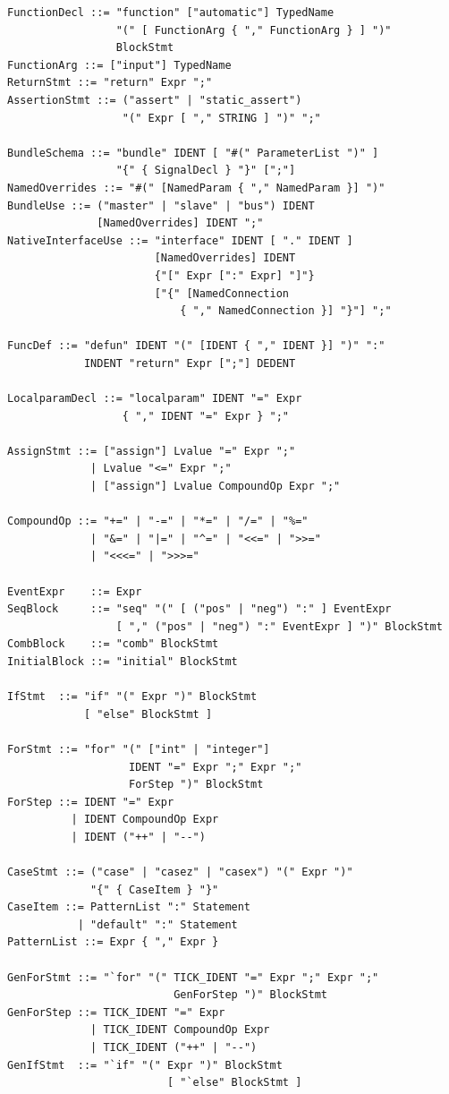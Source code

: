 \documentclass[lang=en,11pt]{elegantbook}
\begin{document}
\begin{lstlisting}[basicstyle=\ttfamily\footnotesize,
  keywordstyle={},
  frame=single,
  backgroundcolor=\color{codebg},
  escapechar=@]
FunctionDecl ::= "function" ["automatic"] TypedName
                 "(" [ FunctionArg { "," FunctionArg } ] ")"
                 BlockStmt
FunctionArg ::= ["input"] TypedName
ReturnStmt ::= "return" Expr ";"
AssertionStmt ::= ("assert" | "static_assert")
                  "(" Expr [ "," STRING ] ")" ";"

BundleSchema ::= "bundle" IDENT [ "#(" ParameterList ")" ]
                 "{" { SignalDecl } "}" [";"]
NamedOverrides ::= "#(" [NamedParam { "," NamedParam }] ")"
BundleUse ::= ("master" | "slave" | "bus") IDENT
              [NamedOverrides] IDENT ";"
NativeInterfaceUse ::= "interface" IDENT [ "." IDENT ]
                       [NamedOverrides] IDENT
                       {"[" Expr [":" Expr] "]"}
                       ["{" [NamedConnection
                           { "," NamedConnection }] "}"] ";"

FuncDef ::= "defun" IDENT "(" [IDENT { "," IDENT }] ")" ":"
            INDENT "return" Expr [";"] DEDENT

LocalparamDecl ::= "localparam" IDENT "=" Expr
                  { "," IDENT "=" Expr } ";"

AssignStmt ::= ["assign"] Lvalue "=" Expr ";"
             | Lvalue "<=" Expr ";"
             | ["assign"] Lvalue CompoundOp Expr ";"

CompoundOp ::= "+=" | "-=" | "*=" | "/=" | "%="
             | "&=" | "|=" | "^=" | "<<=" | ">>="
             | "<<<=" | ">>>="

EventExpr    ::= Expr
SeqBlock     ::= "seq" "(" [ ("pos" | "neg") ":" ] EventExpr
                 [ "," ("pos" | "neg") ":" EventExpr ] ")" BlockStmt
CombBlock    ::= "comb" BlockStmt
InitialBlock ::= "initial" BlockStmt

IfStmt  ::= "if" "(" Expr ")" BlockStmt
            [ "else" BlockStmt ]

ForStmt ::= "for" "(" ["int" | "integer"]
                   IDENT "=" Expr ";" Expr ";"
                   ForStep ")" BlockStmt
ForStep ::= IDENT "=" Expr
          | IDENT CompoundOp Expr
          | IDENT ("++" | "--")

CaseStmt ::= ("case" | "casez" | "casex") "(" Expr ")"
             "{" { CaseItem } "}"
CaseItem ::= PatternList ":" Statement
           | "default" ":" Statement
PatternList ::= Expr { "," Expr }

GenForStmt ::= "`for" "(" TICK_IDENT "=" Expr ";" Expr ";"
                          GenForStep ")" BlockStmt
GenForStep ::= TICK_IDENT "=" Expr
             | TICK_IDENT CompoundOp Expr
             | TICK_IDENT ("++" | "--")
GenIfStmt  ::= "`if" "(" Expr ")" BlockStmt
                         [ "`else" BlockStmt ]


\end{lstlisting}
\end{document}
